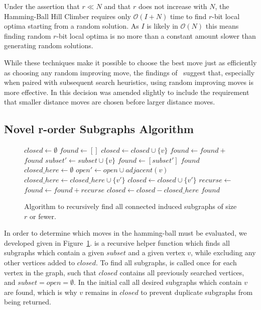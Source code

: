 \documentclass{sig-alternate}
\newcommand{\BigO}[1]{$\mathcal{O}{(#1)}$}
\begin{document}
Under the assertion that $r \ll N$ and that $r$ does not increase with $N$, the
Hamming-Ball Hill Climber requires only \BigO{I+N} time to find $r$-bit local optima starting
from a random solution. As $I$ is likely in \BigO{N} this means finding random $r$-bit local optima
is no more than a constant amount slower than generating random solutions.

While these techniques make it possible to choose the best move just as efficiently
as choosing any random improving move, the findings of~\cite{whitley:2013:greedy} suggest that,
especially when paired with subsequent search heuristics, using random improving moves is more effective.
In \cite{chicano:2014:ball} this decision was amended slightly to include the requirement that smaller
distance moves are chosen before larger distance moves.

\subsection{Novel r-order Subgraphs Algorithm}
\begin{figure}
  \begin{algorithmic}[1]
    \State $closed \leftarrow \emptyset$
    \State $found \leftarrow []$
      \State $closed \leftarrow closed \cup \{v\}$
      \State $found \leftarrow found + $
    \EndFor
    \State \Return $found$
  \EndProcedure
    \State $subset' \leftarrow subset \cup \{v\}$
    \State $found \leftarrow [subset']$
      \Return $found$
    \EndIf
    \State $closed\_here \leftarrow \emptyset$
    \State $open' \leftarrow open \cup adjacent(v)$
        \State $closed\_here \leftarrow closed\_here \cup \{v'\}$
        \State $closed \leftarrow closed \cup \{v'\}$
        \State $recurse \leftarrow $
        \State $found \leftarrow found + recurse$
    \EndFor
    \State $closed \leftarrow closed - closed\_here$
    \State \Return $found$
  \EndProcedure
\end{algorithmic}
  \caption{Algorithm to recursively find all connected induced subgraphs of size $r$ or fewer.}
  \label{fig-connected-subgraphs}
\end{figure}

In order to determine which moves in the hamming-ball must be evaluated,
we developed  given in Figure~\ref{fig-connected-subgraphs}.
 is a recursive helper function which finds all subgraphs
which contain a given $subset$ and a given vertex $v$, while excluding
any other vertices added to $closed$. To find all subgraphs, 
is called once for each vertex in the graph, such that $closed$ contains
all previously searched vertices, and $subset=open=\emptyset$. In the initial
call all desired subgraphs which contain $v$ are found, which is why $v$ remains
in $closed$ to prevent duplicate subgraphs from being returned.
\end{document}
